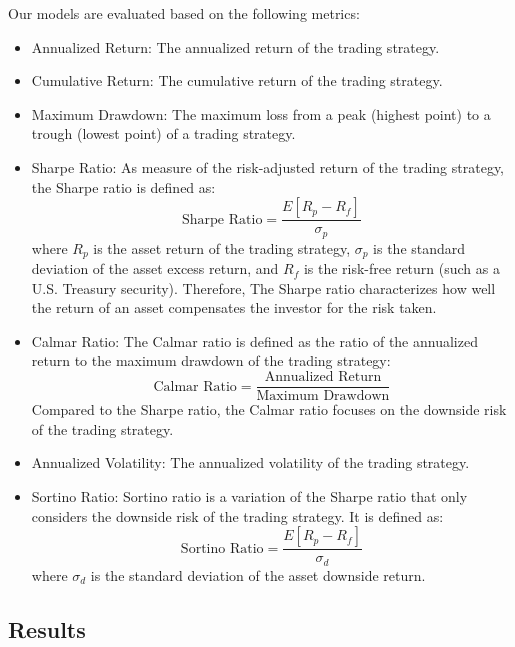 \documentclass[conference]{IEEEtran}
\begin{document}
Our models are evaluated based on the following metrics:
\begin{itemize}
  \item Annualized Return: The annualized return of the trading strategy.
  \item Cumulative Return: The cumulative return of the trading strategy.
  \item Maximum Drawdown: The maximum loss from a peak (highest point) to a trough (lowest point) of a trading strategy.
  \item Sharpe Ratio: As measure of the risk-adjusted return of the trading strategy, the Sharpe ratio is defined as:
    \begin{equation}
      \text{Sharpe Ratio} = \frac{E[R_p - R_f]}{\sigma_p}
    \end{equation}
    where $R_p$ is the asset return of the trading strategy, $\sigma_p$ is the standard deviation of the asset excess return, and $R_f$ is the risk-free return (such as a U.S. Treasury security).
    Therefore, The Sharpe ratio characterizes how well the return of an asset compensates the investor for the risk taken.
  \item Calmar Ratio:
    The Calmar ratio is defined as the ratio of the annualized return to the maximum drawdown of the trading strategy:
    \begin{equation}
      \text{Calmar Ratio} = \frac{\text{Annualized Return}}{\text{Maximum Drawdown}}
    \end{equation}
    Compared to the Sharpe ratio, the Calmar ratio focuses on the downside risk of the trading strategy.

  \item Annualized Volatility: The annualized volatility of the trading strategy.
  \item Sortino Ratio: Sortino ratio is a variation of the Sharpe ratio that only considers the downside risk of the trading strategy. It is defined as:
    \begin{equation}
      \text{Sortino Ratio} = \frac{E[R_p - R_f]}{\sigma_d}
    \end{equation}
    where $\sigma_d$ is the standard deviation of the asset downside return.
\end{itemize}

\subsection{Results}

\end{document}
